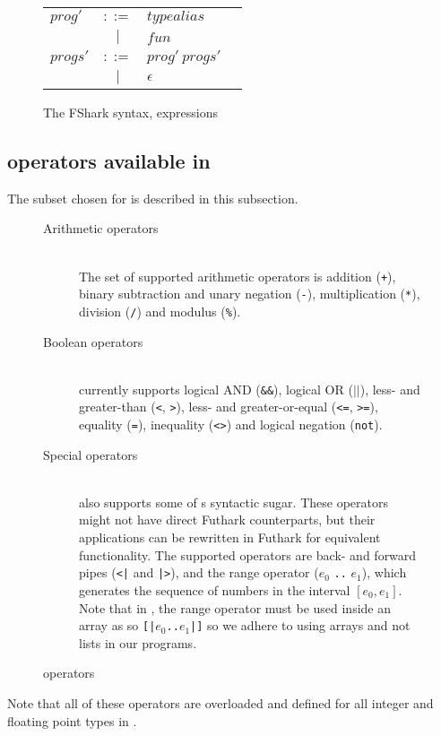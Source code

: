 \begin{figure}
\begin{tabular}{lclr}
    $prog'$ & $::=$ & $typealias$   & \\
            & $|$   & $fun$ & \\

    $progs'$ & $::=$ & $prog'\ progs'$   & \\
             & $|$   & $\epsilon$ & \\
  \end{tabular}
  \caption{The FShark syntax, expressions}
\end{figure}

\clearpage

\subsection{\fsharp{} operators available in \fshark{}}
The \fsharp{} subset chosen for \fshark{} is described in this subsection.
\begin{figure}[h]
  \centering
\begin{description}
\item[Arithmetic operators]\hfill\\
  The set of supported arithmetic operators is addition (\texttt{+}),
  binary subtraction and unary negation (\texttt{-}), multiplication
  (\texttt{*}), division (\texttt{/}) and modulus (\texttt{\%}).
  
\item[Boolean operators]\hfill\\
  \fshark{} currently supports logical AND (\texttt{\&\&}), logical OR
  (\texttt{$||$}), less- and greater-than (\texttt{<}, \texttt{>}), less- and
  greater-or-equal (\texttt{<=}, \texttt{>=}), equality (\texttt{=}),
  inequality (\texttt{<>}) and logical negation (\texttt{not}).

\item[Special operators]\hfill\\
  \fshark{} also supports some of \fsharp{}s syntactic sugar. These operators
  might not have direct Futhark counterparts, but their applications can be
  rewritten in Futhark for equivalent functionality.
  The supported operators are back- and forward pipes (\texttt{<|} and
  \texttt{|>}), and the range operator ($e_0$ \texttt{..} $e_1$), which
  generates the sequence of numbers in the interval $[e_0,e_1]$. Note that in
  \fshark{}, the range operator must be used inside an array as so
  \texttt{[|$e_0$..$e_1$|]} so we adhere to using arrays and not lists in our
  \fshark{} programs.
\end{description}
  \caption{\fshark{} operators}
  \label{fig:fsharkops}
\end{figure}
Note that all of these operators are overloaded and defined for all integer
and floating point types in \fsharp{}.



